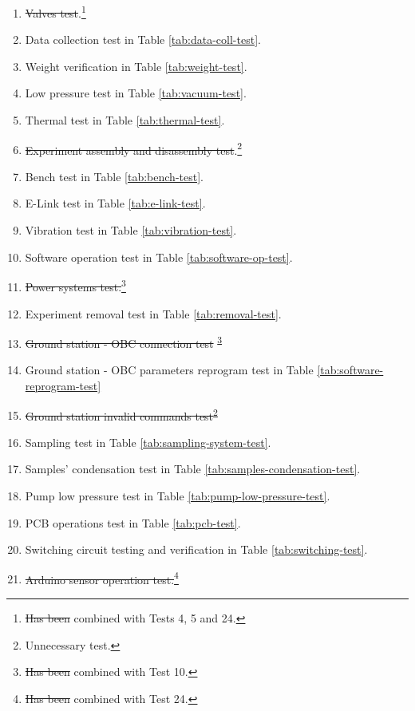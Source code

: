 \documentclass[a4paper,12pt,oneside]{article}
\providecommand{\DIFaddtex}[1]{{\protect\color{blue}\uwave{#1}}} %
\providecommand{\DIFdeltex}[1]{{\protect\color{red}\sout{#1}}}                      %
\providecommand{\DIFaddbegin}{} %
\providecommand{\DIFaddend}{} %
\providecommand{\DIFdelbegin}{} %
\providecommand{\DIFdelend}{} %
\providecommand{\DIFadd}[1]{\texorpdfstring{\DIFaddtex{#1}}{#1}} %
\providecommand{\DIFdel}[1]{\texorpdfstring{\DIFdeltex{#1}}{}} %
\newcommand{\DIFscaledelfig}{0.5}
\newlength{\DIFdelgraphicswidth} %
\newlength{\DIFdelgraphicsheight} %
\newcommand{\DIFaddincludegraphics}[2][]{{\color{blue}\fbox{\DIFOincludegraphics[#1]{#2}}}} %
\newcommand{\DIFdelincludegraphics}[2][]{%
\sbox{\DIFdelgraphicsbox}{\DIFOincludegraphics[#1]{#2}}%
\settoboxwidth{\DIFdelgraphicswidth}{\DIFdelgraphicsbox} %
\settoboxtotalheight{\DIFdelgraphicsheight}{\DIFdelgraphicsbox} %
\scalebox{\DIFscaledelfig}{%
\parbox[b]{\DIFdelgraphicswidth}{\usebox{\DIFdelgraphicsbox}\\[-\baselineskip] \rule{\DIFdelgraphicswidth}{0em}}\llap{\resizebox{\DIFdelgraphicswidth}{\DIFdelgraphicsheight}{%
\setlength{\unitlength}{\DIFdelgraphicswidth}%
\begin{picture}(1,1)%
\thicklines\linethickness{2pt} %
{\color[rgb]{1,0,0}\put(0,0){\framebox(1,1){}}}%
{\color[rgb]{1,0,0}\put(0,0){\line( 1,1){1}}}%
{\color[rgb]{1,0,0}\put(0,1){\line(1,-1){1}}}%
\end{picture}%
}\hspace*{3pt}}} %
} %
\DeclareRobustCommand{\DIFaddbegin}{\DIFOaddbegin \let\includegraphics\DIFaddincludegraphics} %
\DeclareRobustCommand{\DIFaddend}{\DIFOaddend \let\includegraphics\DIFOincludegraphics} %
\DeclareRobustCommand{\DIFdelbegin}{\DIFOdelbegin \let\includegraphics\DIFdelincludegraphics} %
\DeclareRobustCommand{\DIFdelend}{\DIFOaddend \let\includegraphics\DIFOincludegraphics} %
\begin{document}
\begin{enumerate}
    \item \st{Valves test}.\footnote{\DIFdelbegin \DIFdel{Has been }\DIFdelend \DIFaddbegin \DIFadd{Was }\DIFaddend combined with Tests 4, 5 and 24.\label{fn:test-combined}}
    \item Data collection test in Table \ref{tab:data-coll-test}.
    \item Weight verification in Table \ref{tab:weight-test}.
    \item Low pressure test in Table \ref{tab:vacuum-test}.
    \item Thermal test in Table \ref{tab:thermal-test}.
    \item \st{Experiment assembly and disassembly test}.\footnote{Unnecessary test.\label{fn:test-removed}}
    \item Bench test in Table \ref{tab:bench-test}.
    \item E-Link test in Table \ref{tab:e-link-test}.
    \item Vibration test in Table \ref{tab:vibration-test}.
    \item Software operation test in Table \ref{tab:software-op-test}.
    \item \st{Power systems test.}\footnote{\DIFdelbegin \DIFdel{Has been }\DIFdelend \DIFaddbegin \DIFadd{Was }\DIFaddend combined with Test 10.\label{fn:test-combined10}}
    \item Experiment removal test in Table \ref{tab:removal-test}.
    \item \st{Ground station - OBC connection test} \textsuperscript{\ref{fn:test-combined10}}
    \item Ground station - OBC parameters reprogram test in Table \ref{tab:software-reprogram-test}
    \item \st{Ground station invalid commands test}\textsuperscript{\ref{fn:test-removed}}
    \item Sampling test in Table \ref{tab:sampling-system-test}.
    \item Samples' condensation test in Table \ref{tab:samples-condensation-test}.
    \item Pump low pressure test in Table \ref{tab:pump-low-pressure-test}.
    \item PCB operations test in Table \ref{tab:pcb-test}.
    \item Switching circuit testing and verification in Table \ref{tab:switching-test}.
    \item \st{Arduino sensor operation test.}\footnote{\DIFdelbegin \DIFdel{Has been }\DIFdelend \DIFaddbegin \DIFadd{Was }\DIFaddend combined with Test 24.\label{fn:test-combined24}}

\end{enumerate}
\end{document}
